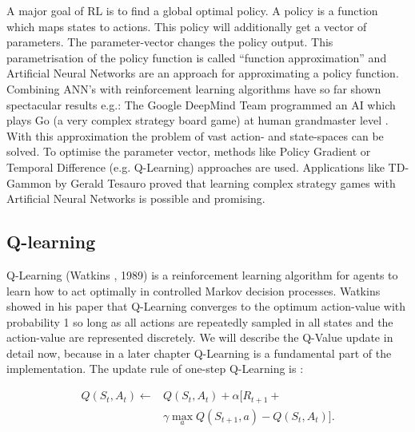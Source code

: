 \documentclass[conference]{IEEEtran}
\begin{document}
A major goal of RL is to find a global optimal policy. A policy is a function which maps states to actions. This policy will additionally get a vector of parameters. The parameter-vector changes the policy output. This parametrisation of the policy function is called “function approximation” and Artificial Neural Networks are an approach for approximating a policy function. Combining ANN's with reinforcement learning algorithms have so far shown spectacular results e.g.: The Google DeepMind Team programmed an AI which plays Go (a very complex strategy board game) at human grandmaster level \cite{DRL:Silver_2016}. With this approximation the problem of vast action- and state-spaces can be solved. To optimise the parameter vector, methods  like Policy Gradient or Temporal Difference (e.g. Q-Learning) approaches are used. Applications like TD-Gammon by Gerald Tesauro proved that learning complex strategy games with Artificial Neural Networks is possible and promising.

\subsection{Q-learning}
Q-Learning (Watkins \cite{Watkins_1992}, 1989) is a reinforcement learning algorithm for agents to learn how to act optimally in controlled Markov decision processes. Watkins showed in his paper that Q-Learning converges to the optimum action-value with probability 1 so long as all actions are repeatedly sampled in all states and the action-value are represented discretely. We will describe the Q-Value update in detail now, because in a later chapter Q-Learning is a fundamental part of the implementation. The update rule of one-step Q-Learning is \cite{sutton_barto_98}:

\begin{equation}
\begin{split}
Q(S_t, A_t) \leftarrow & Q(S_t, A_t) + \alpha[R_{t+1} + \\
 & \gamma \max_a Q(S_{t+1},a) - Q(S_t, A_t)].
\end{split}
\end{equation}
\end{document}

